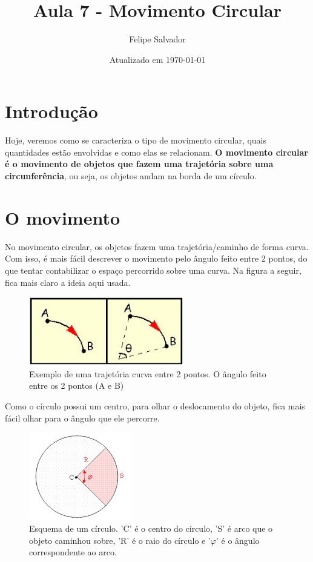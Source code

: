 \documentclass[12pt]{extarticle}
\title{Aula 7 - Movimento Circular}
\author{Felipe Salvador}
\date{Atualizado em \today}
\newcommand{\<}{\langle}
\renewcommand{\>}{\rangle}
\theoremstyle{definition}
\begin{document}
\maketitle

\section{Introdução}

Hoje, veremos como se caracteriza o tipo de movimento circular, quais quantidades estão envolvidas e como elas se relacionam. \textbf{O movimento circular é o movimento de objetos que fazem uma trajetória sobre uma circunferência}, ou seja, os objetos andam na borda de um círculo.

\section{O movimento}

No movimento circular, os objetos fazem uma trajetória/caminho de forma curva. Com isso, é mais fácil descrever o movimento pelo ângulo feito entre 2 pontos, do que tentar contabilizar o espaço percorrido sobre uma curva. Na figura a seguir, fica mais claro a ideia aqui usada.
\begin{figure}[H]
    \centering
    \includegraphics[width=0.6\textwidth]{movimento circular uniforme 3.jpg}
    \caption{Exemplo de uma trajetória curva entre 2 pontos. O ângulo feito entre os 2 pontos (A e B)}
\end{figure}

Como o círculo possui um centro, para olhar o deslocamento do objeto, fica mais fácil olhar para o ângulo que ele percorre.
\begin{figure}[H]
    \centering
    \includegraphics[width=0.4\textwidth]{mcu1.png}
    \caption{Esquema de um círculo. 'C' é o centro do círculo, 'S' é arco que o objeto caminhou sobre, 'R' é o raio do círculo e '$\varphi$' é o ângulo correspondente ao arco.}
    \label{fig:mcu_2}
\end{figure}
\end{document}
